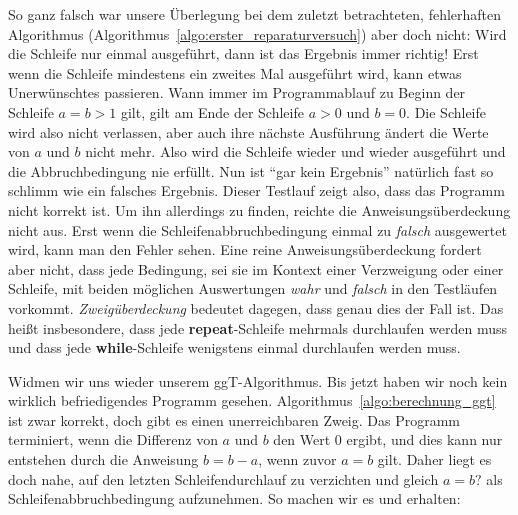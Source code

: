 \vspace{2mm} %


\vspace{2mm} %

So ganz falsch war unsere Überlegung bei dem zuletzt betrachteten, fehlerhaften Algorithmus (Algorithmus~\ref{algo:erster_reparaturversuch}) aber doch nicht: Wird die Schleife nur einmal ausgeführt, dann ist das Ergebnis immer richtig! Erst wenn die Schleife mindestens ein zweites Mal ausgeführt wird, kann etwas Unerwünschtes passieren. Wann immer im Pro\-gramm\-ab\-lauf zu Beginn der Schleife $a=b>1$ gilt, gilt am Ende der Schleife $a>0 $ und $b=0$. Die Schleife wird also nicht verlassen, aber auch ihre nächste Ausführung ändert die Werte von $a$ und $ b $ nicht mehr. Also wird die Schleife wieder und wieder ausgeführt und die Abbruchbedingung nie erfüllt. Nun ist "`gar kein Ergebnis"' natürlich fast so schlimm wie ein falsches Ergebnis. Dieser Testlauf zeigt also, dass das Programm nicht korrekt ist. Um ihn allerdings zu finden, reichte die Anweisungsüberdeckung nicht aus. Erst wenn die Schleifenabbruchbedingung einmal zu \emph{falsch} ausgewertet wird, kann man den Fehler sehen. Eine reine Anweisungs\-über\-deckung fordert aber nicht, dass jede Bedingung, sei sie im Kontext einer Verzweigung oder einer Schleife, mit beiden möglichen Auswertungen \emph{wahr} und \emph{falsch} in den Testläufen vorkommt. \emph{Zweigüberdeckung} 
bedeutet dagegen, dass genau dies der Fall ist. Das heißt insbesondere, dass jede \textbf{repeat}-Schleife mehrmals durchlaufen werden muss und dass jede \textbf{while}-Schleife wenigstens einmal durchlaufen werden muss.

\vspace{3mm} %

Widmen wir uns wieder unserem ggT-Algorithmus. Bis jetzt haben wir noch kein wirklich befriedigendes Programm gesehen. Algorithmus~\ref{algo:berechnung_ggt} ist zwar korrekt, doch gibt es einen unerreichbaren Zweig. Das Programm terminiert, wenn die Differenz von $a$ und $b$ den Wert 0 ergibt, und dies kann nur entstehen durch die Anweisung $b=b-a$, wenn zuvor $a=b$ gilt. Daher liegt es doch nahe, auf den letzten Schleifendurchlauf zu verzichten und gleich $a=b?$ als Schleifenabbruchbedingung aufzunehmen. So machen wir es und erhalten:

\vspace{\baselineskip} %
\vspace{\baselineskip} %

